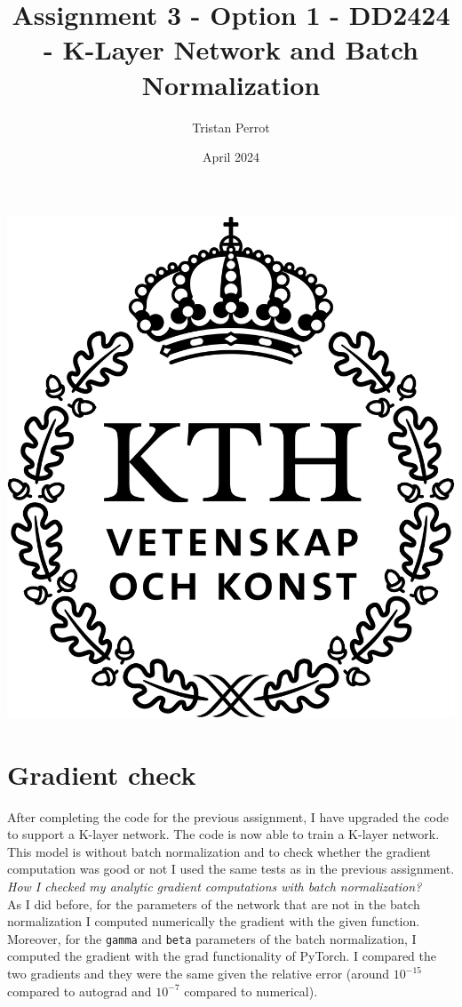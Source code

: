 \documentclass{article}
\title{Assignment 3 - Option 1 - DD2424 - K-Layer Network and Batch Normalization}
\author{Tristan Perrot}
\date{April 2024}
\begin{document}
\maketitle
\begin{center}
    \includegraphics[scale=0.25]{images/KTH_logo_RGB_svart.png}
\end{center}

\section*{Gradient check}

After completing the code for the previous assignment, I have upgraded the code to support a K-layer network. The code is now able to train a K-layer network. This model is without batch normalization and to check whether the gradient computation was good or not I used the same tests as in the previous assignment. \\
\textit{How I checked my analytic gradient computations with batch normalization?} \\
As I did before, for the parameters of the network that are not in the batch normalization I computed numerically the gradient with the given function. Moreover, for the \texttt{gamma} and \texttt{beta} parameters of the batch normalization, I computed the gradient with the grad functionality of PyTorch. I compared the two gradients and they were the same given the relative error (around $10^{-15}$ compared to autograd and $10^{-7}$ compared to numerical). \\
\end{document}
